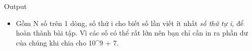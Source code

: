 Output
\begin{itemize}
	\item     Gồm N số trên 1 dòng, số thứ i cho biết số lần viết    \emph{}    ít nhất    \emph{     số thứ tự i,    }    để hoàn thành bài tập. Vì các số có thể rất lớn nên bạn chỉ cần in ra phần dư của chúng khi chia cho 10^9 + 7.   
\end{itemize}